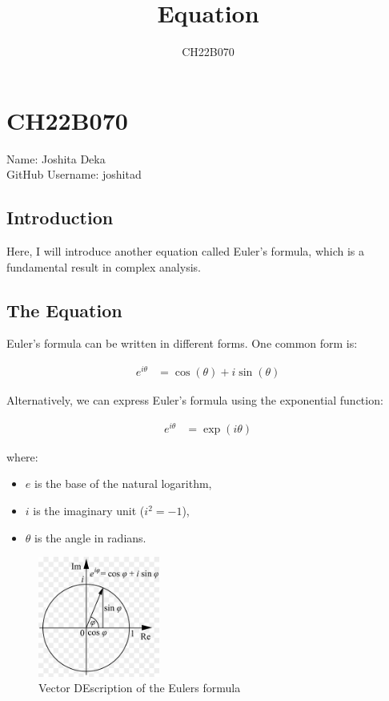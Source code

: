 \documentclass[12pt]{article}
\author{CH22B070}
\title{Equation}
\begin{document}
\maketitle

\section{CH22B070}

Name: Joshita Deka \\
GitHub Username: joshitad


\subsection{Introduction}

Here, I will introduce another equation called Euler's formula, which is a fundamental result in complex analysis.

\subsection{The Equation}

Euler's formula can be written in different forms. One common form is:

\begin{align*}
    e^{i\theta} &= \cos(\theta) + i\sin(\theta)
\end{align*}

Alternatively, we can express Euler's formula using the exponential function:

\begin{align*}
    e^{i\theta} &= \exp(i\theta)
\end{align*}

where:
\begin{itemize}
    \item \(e\) is the base of the natural logarithm,
    \item \(i\) is the imaginary unit (\(i^2 = -1\)),
    \item \(\theta\) is the angle in radians.
\end{itemize}
\begin{figure}[htp]
    \centering
    \includegraphics[width=4cm]{image}
    \caption{Vector DEscription of the Eulers formula}
    \label{fig: Eulers vector formula}
\end{figure}
\end{document}
